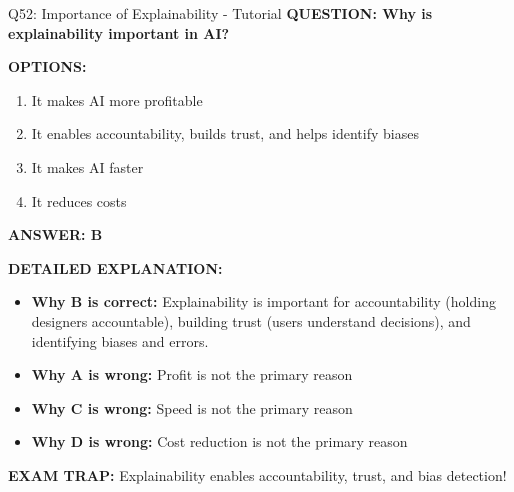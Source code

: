 \documentclass[8pt]{beamer}
\begin{document}
	\begin{frame}{Q52: Importance of Explainability - Tutorial}
		\fontsize{6.5}{7.5}\selectfont
		\textbf{QUESTION: Why is explainability important in AI?}
		
		\vspace{0.1cm}
		\textbf{OPTIONS:}
		\begin{enumerate}
			\item It makes AI more profitable
			\item It enables accountability, builds trust, and helps identify biases
			\item It makes AI faster
			\item It reduces costs
		\end{enumerate}
		
		\vspace{0.1cm}
		\textcolor{myblue}{\textbf{ANSWER: B}}
		
		\vspace{0.1cm}
		\textbf{DETAILED EXPLANATION:}
		\begin{itemize}
			\item \textbf{Why B is correct:} Explainability is important for accountability (holding designers accountable), building trust (users understand decisions), and identifying biases and errors.
			\item \textbf{Why A is wrong:} Profit is not the primary reason
			\item \textbf{Why C is wrong:} Speed is not the primary reason
			\item \textbf{Why D is wrong:} Cost reduction is not the primary reason
		\end{itemize}
		
		\textcolor{myred}{\textbf{EXAM TRAP:}} Explainability enables \textcolor{myblue}{accountability, trust, and bias detection}!
	\end{frame}
	
\end{document}
